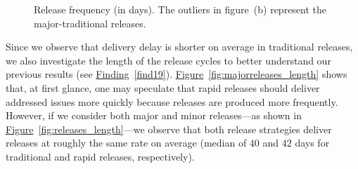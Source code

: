 \begin{figure}[t!]
	\centering
	\caption{Release frequency (in days). The outliers in figure~(b)
		represent the major-traditional releases.}
	\label{fig:release_length_analysis}
\end{figure}

\noindent{} Since we
observe that delivery delay is shorter on average in traditional releases, we
also investigate the length of the release cycles to better understand our
previous results (see \hyperref[find19]{Finding}~\ref{find19}).
\hyperref[fig:majorreleases_length]{Figure}~\ref{fig:majorreleases_length} shows
that, at first glance, one may speculate that rapid releases should deliver
addressed issues more quickly because releases are produced more frequently.
However, if we consider both major and minor releases---as shown in
\hyperref[fig:releases_length]{Figure}~\ref{fig:releases_length}---we observe
that both release strategies deliver releases at roughly the same rate on
average (median of $40$ and $42$ days for traditional and rapid releases,
respectively).\\

